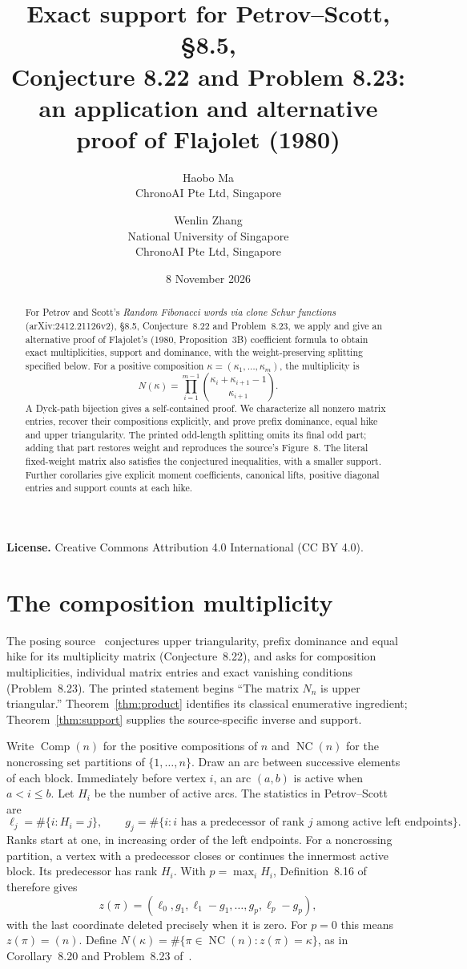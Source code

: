\documentclass[11pt]{article}
\title{Exact support for Petrov--Scott, \S8.5,\\
Conjecture 8.22 and Problem 8.23:\\
an application and alternative proof of Flajolet (1980)}
\author{Haobo Ma\\\small ChronoAI Pte Ltd, Singapore
\and Wenlin Zhang\\\small National University of Singapore\\
\small ChronoAI Pte Ltd, Singapore}
\date{8 November 2026}
\newcommand{\NC}{\operatorname{NC}}
\newcommand{\Comp}{\operatorname{Comp}}
\begin{document}
\maketitle
\begin{abstract}
For Petrov and Scott's \emph{Random Fibonacci words via clone Schur
functions} (arXiv:\allowbreak2412.21126v2), \S8.5, Conjecture~8.22 and
Problem~8.23, we apply and give an alternative proof of Flajolet's
(1980, Proposition~3B) coefficient formula to obtain exact multiplicities,
support and dominance, with the weight-preserving splitting specified
below. For a positive composition $\kappa=(\kappa_1,\ldots,\kappa_m)$,
the multiplicity is
\[
N(\kappa)=\prod_{i=1}^{m-1}\binom{\kappa_i+\kappa_{i+1}-1}{\kappa_{i+1}}.
\]
A Dyck-path bijection gives a self-contained proof. We characterize all
nonzero matrix entries, recover their compositions explicitly, and prove
prefix dominance, equal hike and upper triangularity. The printed
odd-length splitting omits its final odd part; adding that part restores
weight and reproduces the source's Figure~8. The literal fixed-weight
matrix also satisfies the conjectured inequalities, with a smaller support.
Further corollaries give explicit moment coefficients, canonical lifts,
positive diagonal entries and support counts at each hike.
\end{abstract}
\noindent\textbf{License.} Creative Commons Attribution 4.0 International
(CC BY 4.0).

\section{The composition multiplicity}
The posing source~\cite[\S8.5, pp.~46--47]{PS} conjectures upper
triangularity, prefix dominance and equal hike for its multiplicity matrix
(Conjecture~8.22), and asks for composition multiplicities, individual
matrix entries and exact vanishing conditions (Problem~8.23).
The printed statement begins ``The matrix $N_n$ is upper triangular.''
Theorem~\ref{thm:product} identifies its classical enumerative ingredient;
Theorem~\ref{thm:support} supplies the source-specific inverse and support.

Write $\Comp(n)$ for the positive compositions of $n$ and $\NC(n)$ for
the noncrossing set partitions of $\{1,\ldots,n\}$. Draw an arc between
successive elements of each block. Immediately before vertex $i$, an
arc $(a,b)$ is active when $a<i\le b$. Let $H_i$ be the number of active
arcs. The statistics in Petrov--Scott~\cite[\S8.1, (8.1)]{PS} are
\[
 \ell_j=\#\{i:H_i=j\},\qquad
 g_j=\#\{i:i\text{ has a predecessor of rank }j
                 \text{ among active left endpoints}\}.
\]
Ranks start at one, in increasing order of the left endpoints.
For a noncrossing partition, a vertex with a predecessor closes or
continues the innermost active block. Its predecessor has rank $H_i$.
With $p=\max_i H_i$, Definition~8.16 of~\cite{PS} therefore gives
\[
 z(\pi)=(\ell_0,g_1,\ell_1-g_1,\ldots,g_p,\ell_p-g_p),
 \tag{1}
\]
with the last coordinate deleted precisely when it is zero. For $p=0$
this means $z(\pi)=(n)$. Define
$N(\kappa)=\#\{\pi\in\NC(n):z(\pi)=\kappa\}$, as in
Corollary~8.20 and Problem~8.23 of~\cite{PS}.
\end{document}
